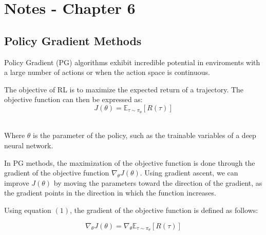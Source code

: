 \documentclass[a4paper]{article}
\begin{document}
\section*{Notes - Chapter 6}


\subsection*{Policy Gradient Methods}
\hspace{0,75cm}Policy Gradient (PG) algorithms exhibit incredible potential in enviroments with a large number of actions or when the action space is continuous.

\hspace{0,75cm}The objective of RL is to maximize the expected return of a trajectory. The objective function can then be expressed as:\\
\begin{equation}
J(\theta) = \mathbb{E}_{\tau \sim \pi_{\theta}}[R(\tau)]
\end{equation}\

Where $\theta$ is the parameter of the policy, such as the trainable variables of a deep neural network.

\hspace{0,75cm}In PG methods, the maximization of the objective function is done through the gradient of the objective function $\nabla_{\theta}J(\theta)$. Using gradient ascent, we can improve $J(\theta)$ by moving the parameters toward the direction of the gradient, as the gradient points in the direction in which the function increases.

\hspace{0,75cm}Using equation $(1)$, the gradient of the objective function is defined as follows:

\begin{equation}
\nabla_{\theta}J(\theta) = \nabla_{\theta}\mathbb{E}_{\tau \sim \pi_{\theta}}[R(\tau)]
\end{equation}
\end{document}
